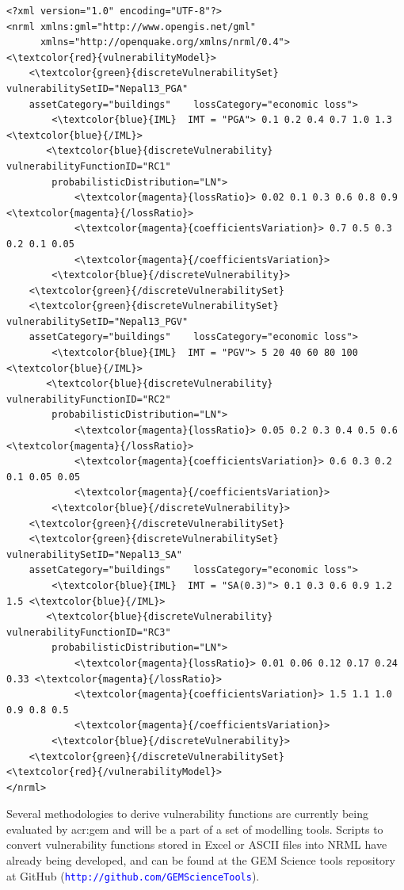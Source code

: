 \begin{Verbatim}[frame=single, commandchars=\\\{\}, samepage=false]
<?xml version="1.0" encoding="UTF-8"?>
<nrml xmlns:gml="http://www.opengis.net/gml"
      xmlns="http://openquake.org/xmlns/nrml/0.4">
<\textcolor{red}{vulnerabilityModel}>
    <\textcolor{green}{discreteVulnerabilitySet} vulnerabilitySetID="Nepal13_PGA"
    assetCategory="buildings"    lossCategory="economic loss">
        <\textcolor{blue}{IML}  IMT = "PGA"> 0.1 0.2 0.4 0.7 1.0 1.3 <\textcolor{blue}{/IML}>
       <\textcolor{blue}{discreteVulnerability}  vulnerabilityFunctionID="RC1"
        probabilisticDistribution="LN">
            <\textcolor{magenta}{lossRatio}> 0.02 0.1 0.3 0.6 0.8 0.9 <\textcolor{magenta}{/lossRatio}>
            <\textcolor{magenta}{coefficientsVariation}> 0.7 0.5 0.3 0.2 0.1 0.05
            <\textcolor{magenta}{/coefficientsVariation}>
        <\textcolor{blue}{/discreteVulnerability}>
    <\textcolor{green}{/discreteVulnerabilitySet}
    <\textcolor{green}{discreteVulnerabilitySet} vulnerabilitySetID="Nepal13_PGV"
    assetCategory="buildings"    lossCategory="economic loss">
        <\textcolor{blue}{IML}  IMT = "PGV"> 5 20 40 60 80 100 <\textcolor{blue}{/IML}>
       <\textcolor{blue}{discreteVulnerability}  vulnerabilityFunctionID="RC2"
        probabilisticDistribution="LN">
            <\textcolor{magenta}{lossRatio}> 0.05 0.2 0.3 0.4 0.5 0.6 <\textcolor{magenta}{/lossRatio}>
            <\textcolor{magenta}{coefficientsVariation}> 0.6 0.3 0.2 0.1 0.05 0.05
            <\textcolor{magenta}{/coefficientsVariation}>
        <\textcolor{blue}{/discreteVulnerability}>
    <\textcolor{green}{/discreteVulnerabilitySet}
    <\textcolor{green}{discreteVulnerabilitySet} vulnerabilitySetID="Nepal13_SA"
    assetCategory="buildings"    lossCategory="economic loss">
        <\textcolor{blue}{IML}  IMT = "SA(0.3)"> 0.1 0.3 0.6 0.9 1.2 1.5 <\textcolor{blue}{/IML}>
       <\textcolor{blue}{discreteVulnerability}  vulnerabilityFunctionID="RC3" 
        probabilisticDistribution="LN">
            <\textcolor{magenta}{lossRatio}> 0.01 0.06 0.12 0.17 0.24 0.33 <\textcolor{magenta}{/lossRatio}>
            <\textcolor{magenta}{coefficientsVariation}> 1.5 1.1 1.0 0.9 0.8 0.5
            <\textcolor{magenta}{/coefficientsVariation}>
        <\textcolor{blue}{/discreteVulnerability}>
    <\textcolor{green}{/discreteVulnerabilitySet}
<\textcolor{red}{/vulnerabilityModel}>
</nrml>
\end{Verbatim}

Several methodologies to derive vulnerability functions are currently being evaluated by \gls{acr:gem} and will be a part of a set of modelling tools. Scripts to convert \glspl{vulnerability function} stored in Excel or ASCII files into NRML have already being developed, and can be found at the GEM Science tools repository at GitHub (\textcolor{blue}{\Verb+http://github.com/GEMScienceTools+}).